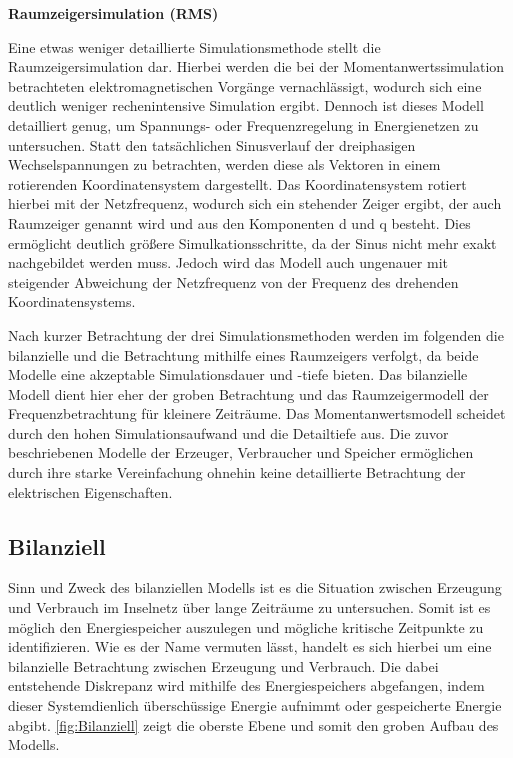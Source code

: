 \textbf{Raumzeigersimulation (RMS)}

Eine etwas weniger detaillierte Simulationsmethode stellt die Raumzeigersimulation dar. Hierbei werden die bei der Momentanwertssimulation betrachteten elektromagnetischen Vorgänge vernachlässigt, wodurch sich eine deutlich weniger rechenintensive Simulation ergibt. Dennoch ist dieses Modell detailliert genug, um Spannungs- oder Frequenzregelung in Energienetzen zu untersuchen. Statt den tatsächlichen Sinusverlauf der dreiphasigen Wechselspannungen zu betrachten, werden diese als Vektoren in einem rotierenden Koordinatensystem dargestellt. Das Koordinatensystem rotiert hierbei mit der Netzfrequenz, wodurch sich ein stehender Zeiger ergibt, der auch Raumzeiger genannt wird und aus den Komponenten d und q besteht. Dies ermöglicht deutlich größere Simulkationsschritte, da der Sinus nicht mehr exakt nachgebildet werden muss. Jedoch wird das Modell auch ungenauer mit steigender Abweichung der Netzfrequenz von der Frequenz des drehenden Koordinatensystems. \cite{Simulationsmethoden}

Nach kurzer Betrachtung der drei Simulationsmethoden werden im folgenden die bilanzielle und die Betrachtung mithilfe eines Raumzeigers verfolgt, da beide Modelle eine akzeptable Simulationsdauer und -tiefe bieten. Das bilanzielle Modell dient hier eher der groben Betrachtung und das Raumzeigermodell der Frequenzbetrachtung für kleinere Zeiträume. Das Momentanwertsmodell scheidet durch den hohen Simulationsaufwand und die Detailtiefe aus. Die zuvor beschriebenen Modelle der Erzeuger, Verbraucher und Speicher ermöglichen durch ihre starke Vereinfachung ohnehin keine detaillierte Betrachtung der elektrischen Eigenschaften.

\subsection{Bilanziell}

Sinn und Zweck des bilanziellen Modells ist es die Situation zwischen Erzeugung und Verbrauch im Inselnetz über lange Zeiträume zu untersuchen. Somit ist es möglich den Energiespeicher auszulegen und mögliche kritische Zeitpunkte zu identifizieren. Wie es der Name vermuten lässt, handelt es sich hierbei um eine bilanzielle Betrachtung zwischen Erzeugung und Verbrauch. Die dabei entstehende Diskrepanz wird mithilfe des Energiespeichers abgefangen, indem dieser Systemdienlich überschüssige Energie aufnimmt oder gespeicherte Energie abgibt. \autoref{fig:Bilanziell} zeigt die oberste Ebene und somit den groben Aufbau des Modells.


